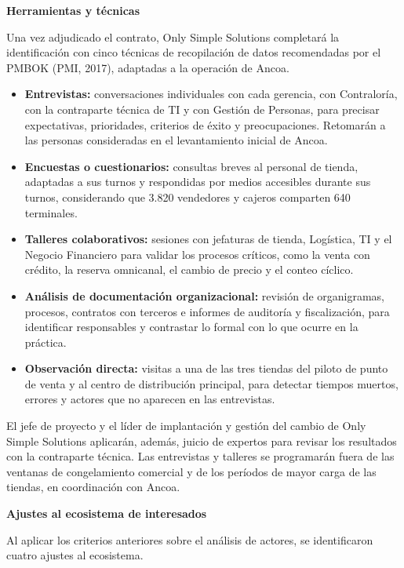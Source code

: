 \documentclass[11pt]{article}
\begin{document}
\textbf{Herramientas y técnicas}

Una vez adjudicado el contrato, Only Simple Solutions completará la
identificación con cinco técnicas de recopilación de datos recomendadas
por el PMBOK (PMI, 2017), adaptadas a la operación de Ancoa.

\begin{itemize}
\item
  \textbf{Entrevistas:} conversaciones individuales con cada gerencia,
  con Contraloría, con la contraparte técnica de TI y con Gestión de
  Personas, para precisar expectativas, prioridades, criterios de éxito
  y preocupaciones. Retomarán a las personas consideradas en el
  levantamiento inicial de Ancoa.
\item
  \textbf{Encuestas o cuestionarios:} consultas breves al personal de
  tienda, adaptadas a sus turnos y respondidas por medios accesibles
  durante sus turnos, considerando que 3.820 vendedores y cajeros
  comparten 640 terminales.
\item
  \textbf{Talleres colaborativos:} sesiones con jefaturas de tienda,
  Logística, TI y el Negocio Financiero para validar los procesos
  críticos, como la venta con crédito, la reserva omnicanal, el cambio
  de precio y el conteo cíclico.
\item
  \textbf{Análisis de documentación organizacional:} revisión de
  organigramas, procesos, contratos con terceros e informes de auditoría
  y fiscalización, para identificar responsables y contrastar lo formal
  con lo que ocurre en la práctica.
\item
  \textbf{Observación directa:} visitas a una de las tres tiendas del
  piloto de punto de venta y al centro de distribución principal, para
  detectar tiempos muertos, errores y actores que no aparecen en las
  entrevistas.
\end{itemize}

El jefe de proyecto y el líder de implantación y gestión del cambio de
Only Simple Solutions aplicarán, además, juicio de expertos para revisar
los resultados con la contraparte técnica. Las entrevistas y talleres se
programarán fuera de las ventanas de congelamiento comercial y de los
períodos de mayor carga de las tiendas, en coordinación con Ancoa.

\textbf{Ajustes al ecosistema de interesados}

Al aplicar los criterios anteriores sobre el análisis de actores, se
identificaron cuatro ajustes al ecosistema.
\end{document}
